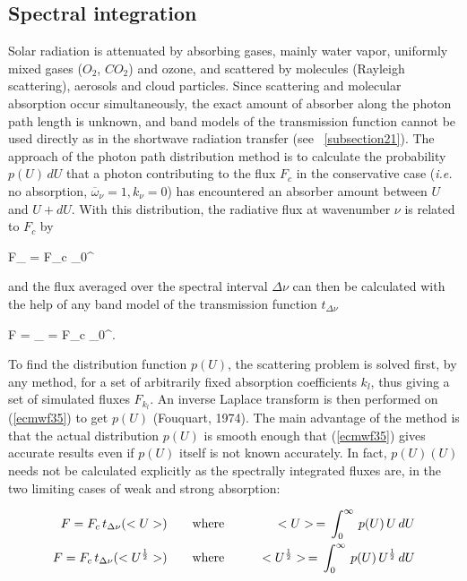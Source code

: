 %
\subsection{Spectral integration}
%

Solar radiation is attenuated by absorbing gases, mainly water vapor, uniformly mixed gases ($O_2$, $CO_2$)\footnotemark
%
and ozone, and scattered by molecules (Rayleigh scattering), aerosols and cloud particles. Since scattering and molecular absorption occur simultaneously, the
exact amount of absorber along the photon path length is unknown, and band
models of the transmission function cannot be used directly as in the shortwave
radiation transfer (see ~\ref{subsection21}). The approach of the photon path
distribution method is to calculate the probability $p(U) \, dU$ that a photon
contributing to the flux $F_c$ in the conservative case ({\em i.e.} no
absorption, $\overline{\omega}_{\nu} = 1, k_{\nu} = 0$) has encountered an
absorber amount between $U$ and $U + dU$. With this distribution, the radiative flux at wavenumber $\nu $ is related to $F_c$ by

\medskip
\be
F_{\nu} = F_c \int_0^{\infty}
\label{ecmwf35}
\ee
\medskip

\noindent and the flux averaged over the spectral interval $\Delta\nu$ can then be calculated with the help of any band model of the transmission function $t_{\Delta\nu}$

\medskip
\be
F =  \int_{\Delta\nu} = F_c \int_0^{\infty}.
\label{ecmwf36}
\ee
\medskip

To find the distribution function $p(U)$, the scattering problem is solved first, by any method, for a set of arbitrarily fixed absorption coefficients $k_l$, thus giving a set of simulated fluxes $F_{k_l}$. An inverse Laplace transform is then performed on (\ref{ecmwf35}) to get $p(U)$ (Fouquart, 1974). The main advantage of the method is that the actual distribution $p(U)$ is smooth enough that (\ref{ecmwf35}) gives accurate results even if $p(U)$ itself is not known accurately. In fact, $p(U)(U)$ needs not be calculated explicitly as the spectrally integrated fluxes are, in the two limiting cases of weak and strong absorption:

\medskip
\begin{eqnarray}\label{ecmwf37}
F = F_c \, t_{\Delta\nu}(<U>)   \qquad &{\rm where}& \qquad <U> \, = \, \int_0^{\infty} \, p(U) \, U \, dU \cr
F = F_c \, t_{\Delta\nu}(<U^{\frac{1}{2}}>) \qquad &{\rm where}& \qquad <U^{\frac{1}{2}}> \, = \, \int_0^{\infty} \, p(U) \, U^{\frac{1}{2}} \, dU
\end{eqnarray}
\medskip

